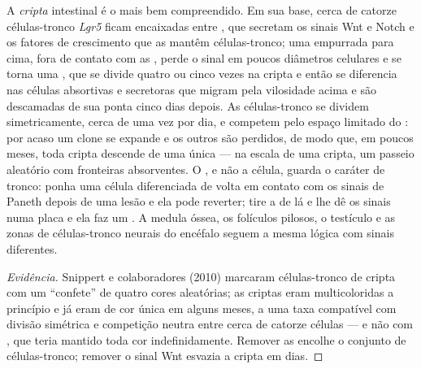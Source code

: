 \begin{proposition}\label{prop:b3:stem-cells:crypt}
A \emph{cripta} intestinal é o  mais bem compreendido. Em sua base,
cerca de catorze células-tronco \emph{Lgr5} ficam encaixadas entre
, que secretam os sinais Wnt e Notch e os fatores de
crescimento que as mantêm células-tronco; uma  empurrada
para cima, fora de contato com as , perde o sinal em
poucos diâmetros celulares e se torna uma , que se divide quatro ou cinco vezes na cripta e então se
diferencia nas células absortivas e secretoras que migram pela vilosidade
acima e são descamadas de sua ponta cinco dias depois. As células-tronco
se dividem simetricamente, cerca de uma vez por dia, e competem pelo
espaço limitado do : por acaso um clone se expande e os outros são
perdidos, de modo que, em poucos meses, toda cripta descende de uma única
 --- \emph{} na escala de uma cripta, um
passeio aleatório com fronteiras absorventes. O , e não a célula,
guarda o caráter de tronco: ponha uma célula diferenciada de volta em
contato com os sinais de Paneth depois de uma lesão e ela pode reverter;
tire a  de lá e lhe dê os sinais numa placa e ela faz um
. A medula óssea, os folículos pilosos, o testículo e as zonas
de células-tronco neurais do encéfalo seguem a mesma lógica com sinais
diferentes.
\end{proposition}
\begin{proof}[Evidência]
Snippert e colaboradores (2010) marcaram células-tronco de cripta com um
``confete'' de quatro cores aleatórias; as criptas eram multicoloridas a
princípio e já eram de cor única em alguns meses, a uma taxa compatível
com divisão simétrica e competição neutra entre cerca de catorze células
--- e não com , que teria mantido toda cor
indefinidamente. Remover as  encolhe o conjunto de
células-tronco; remover o sinal Wnt esvazia a cripta em dias.
\end{proof}

